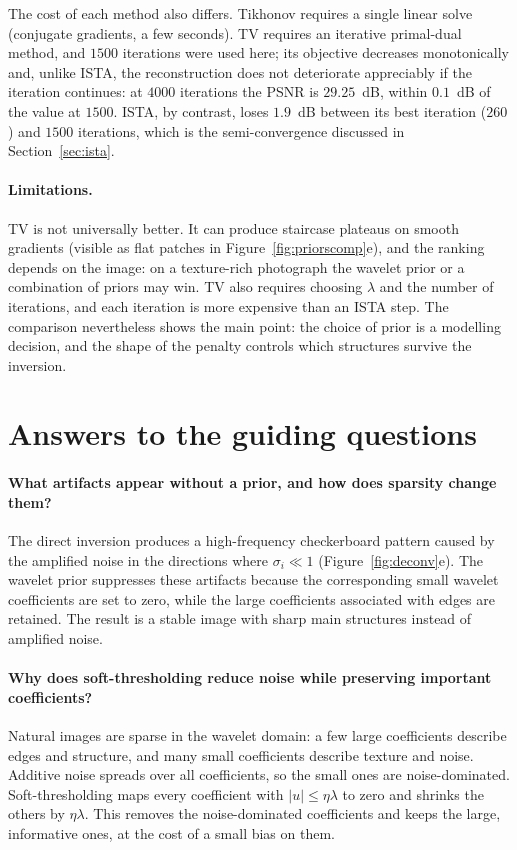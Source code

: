 \documentclass[11pt,a4paper]{article}
\begin{document}
The cost of each method also differs. Tikhonov requires a single linear solve (conjugate
gradients, a few seconds). TV requires an iterative primal-dual method, and $1500$ iterations
were used here; its objective decreases monotonically and, unlike ISTA, the reconstruction does
not deteriorate appreciably if the iteration continues: at $4000$ iterations the PSNR is
$29.25$~dB, within $0.1$~dB of the value at $1500$. ISTA, by contrast, loses $1.9$~dB between
its best iteration ($260$) and $1500$ iterations, which is the semi-convergence discussed in
Section~\ref{sec:ista}.

\paragraph{Limitations.}
TV is not universally better. It can produce staircase plateaus on smooth gradients (visible as
flat patches in Figure~\ref{fig:priorscomp}e), and the ranking depends on the image: on a
texture-rich photograph the wavelet prior or a combination of priors may win. TV also requires
choosing $\lambda$ and the number of iterations, and each iteration is more expensive than an
ISTA step. The comparison nevertheless shows the main point: the choice of prior is a modelling
decision, and the shape of the penalty controls which structures survive the inversion.

\section{Answers to the guiding questions}\label{sec:answers}

\paragraph{What artifacts appear without a prior, and how does sparsity change them?}
The direct inversion produces a high-frequency checkerboard pattern caused by the amplified noise
in the directions where $\sigma_i\ll1$ (Figure~\ref{fig:deconv}e). The wavelet prior suppresses
these artifacts because the corresponding small wavelet coefficients are set to zero, while the
large coefficients associated with edges are retained. The result is a stable image with sharp
main structures instead of amplified noise.

\paragraph{Why does soft-thresholding reduce noise while preserving important coefficients?}
Natural images are sparse in the wavelet domain: a few large coefficients describe edges and
structure, and many small coefficients describe texture and noise. Additive noise spreads over all
coefficients, so the small ones are noise-dominated. Soft-thresholding maps every coefficient with
$|u|\le\eta\lambda$ to zero and shrinks the others by $\eta\lambda$. This removes the
noise-dominated coefficients and keeps the large, informative ones, at the cost of a small bias on
them.
\end{document}
